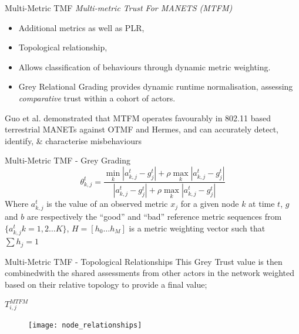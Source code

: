 \documentclass{beamer}
\begin{document}
\begin{frame}{Multi-Metric TMF} 
  \emph{Multi-metric Trust For MANETS (MTFM)} \autocite{Guo11} 
  \begin{itemize}
    \item Additional metrics as well as PLR, 
    \item Topological relationship,
    \item Allows classification of behaviours through dynamic metric weighting.
    \item Grey Relational Grading provides dynamic runtime normalisation, assessing \emph{comparative} trust within a cohort of actors.
  \end{itemize}
  \pause
  \centering
  Guo et al.\autocite{Guo11} demonstrated that MTFM operates favourably in 802.11 based terrestrial MANETs against OTMF and Hermes, and can accurately detect, identify, \& characterise misbehaviours
\end{frame}
\begin{frame}{Multi-Metric TMF - Grey Grading} 
\begin{equation}
  \label{eq:grcg}
  \theta_{k,j}^t = \frac{\min_k|a_{k,j}^t - g_j^t| + \rho \max_k|a_{k,j}^t-g_j^t|}{|a_{k,j}^t-g_j^t| + \rho \max_k|a_{k,j}^t-g_j^t|} 
\end{equation}
Where  $a_{k,j}^t$ is the value of an observed metric $x_j$ for a given node $k$ at time $t$,  $g$ and $b$ are respectively the ``good'' and ``bad'' reference metric sequences from $\{a_{k,j}^t k=1,2\dots K\}$, $H=[h_0\dots h_M]$ is a metric weighting vector such that $\sum h_j = 1$

\end{frame}
\begin{frame}{Multi-Metric TMF - Topological Relationships} 
  \centering
  This Grey Trust value is then combined\footnotemark with the shared assessments from other actors in the network weighted based on their relative topology to provide a final value; 

  \vspace{12pt}

  $T_{i,j}^{MTFM}$
    \begin{figure}[h]
      \centering
      \texttt{[image: node\_relationships]}
      \label{fig:node_relationships}
    \end{figure}

\end{frame}
\end{document}

